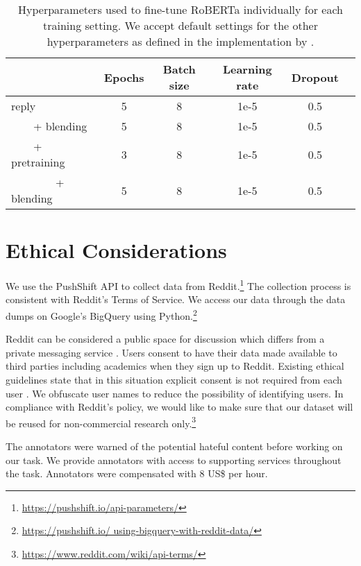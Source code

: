 \documentclass[11pt]{article}
\begin{document}
	\begin{table*}
		\centering
		\small
		\begin{tabular}{lccccc}
			\toprule
			& Epochs & Batch size & Learning rate & Dropout  \\
			\midrule
			reply &  5 & 8 & 1e-5 & 0.5  \\
			~~~~+ blending & 5 & 8 &  1e-5 & 0.5  \\
			~~~~+ pretraining & 3 & 8 &  1e-5 & 0.5 \\
			~~~~~~~~+ blending & 5 & 8 &  1e-5 & 0.5  \\
			\bottomrule
			
		\end{tabular}
		\caption{Hyperparameters used to fine-tune RoBERTa individually for each training setting. We accept default settings for the other hyperparameters as defined in the implementation by \citet{phang2020jiant}. }
		\label{t:hyperparameters}
	\end{table*}
	
	
	\section{Ethical Considerations}
	\label{sec:appendix}
	We use the PushShift API to collect data from Reddit.\footnote{\url{https://pushshift.io/api-parameters/}} 
	The collection process is consistent with Reddit's Terms of Service. 
	We access our data through the data dumps on Google's BigQuery using Python.\footnote{\url{https://pushshift.io/
			using-bigquery-with-reddit-data/}} 
	
	Reddit can be considered a public space for discussion which differs from a private messaging service \cite{vidgen-etal-2021-introducing}. 
	Users consent to have their data made available to third parties including academics when they sign up to Reddit. 
	Existing ethical guidelines state that in this situation explicit consent is not required from each user \cite{DBLP:conf/tto/ProcterWBHEWJ19}. 
	We obfuscate user names to reduce the possibility of identifying users. 
	In compliance with Reddit's policy, we would like to make sure that our dataset will be reused for non-commercial research only.\footnote{\url{https://www.reddit.com/wiki/api-terms/}}
	
	The annotators were warned of the potential hateful content before working on our task. 
	We provide annotators with access to supporting services throughout the task.
	Annotators were compensated with 8 US\$ per hour.
	
\end{document}
